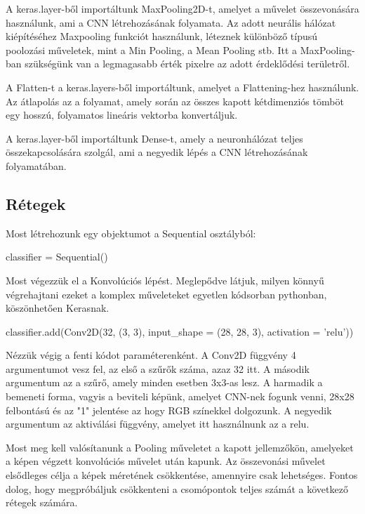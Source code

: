 A keras.layer-ből importáltunk MaxPooling2D-t, amelyet a művelet összevonására használunk, ami a CNN létrehozásának folyamata. Az adott neurális hálózat kiépítéséhez Maxpooling funkciót használunk, léteznek különböző típusú poolozási műveletek, mint a Min Pooling, a Mean Pooling stb. Itt a MaxPooling-ban szükségünk van a legmagasabb érték pixelre az adott érdeklődési területről.

A Flatten-t a keras.layers-ből importáltunk, amelyet a Flattening-hez használunk. Az átlapolás az a folyamat, amely során az összes kapott kétdimenziós tömböt egy hosszú, folyamatos lineáris vektorba konvertáljuk.

A keras.layer-ből importáltunk Dense-t, amely a neuronhálózat teljes összekapcsolására szolgál, ami a negyedik lépés a CNN létrehozásának folyamatában.

\subsection{Rétegek}

Most létrehozunk egy objektumot a Sequential osztályból:

\begin{python}
classifier = Sequential()
\end{python}

Most végezzük el a Konvolúciós lépést. Meglepődve látjuk, milyen könnyű végrehajtani ezeket a komplex műveleteket egyetlen kódsorban pythonban, köszönhetően Kerasnak.

\begin{python}
classifier.add(Conv2D(32, (3, 3), input_shape = (28, 28, 3),
activation = 'relu'))
\end{python}

Nézzük végig a fenti kódot paraméterenként. A Conv2D függvény 4 argumentumot vesz fel, az első a szűrők száma, azaz 32 itt. A második argumentum az a szűrő, amely minden esetben 3x3-as lesz. A harmadik a bemeneti forma, vagyis a beviteli képünk, amelyet CNN-nek fogunk venni, 28x28 felbontású és az "1" jelentése az hogy RGB színekkel dolgozunk. A negyedik argumentum az aktiválási függvény, amelyet itt használnunk az a relu.

Most meg kell valósítanunk a Pooling műveletet a kapott jellemzőkön, amelyeket a képen végzett konvolúciós művelet után kapunk. Az összevonási művelet elsődleges célja a képek méretének csökkentése, amennyire csak lehetséges. Fontos dolog, hogy megpróbáljuk csökkenteni a csomópontok teljes számát a következő rétegek számára.


